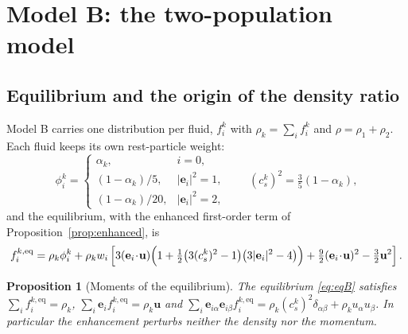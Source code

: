 \documentclass[11pt,a4paper]{article}
\theoremstyle{plain}
\newtheorem{proposition}{Proposition}
\theoremstyle{definition}
\newcommand{\ee}{\mathbf{e}}
\newcommand{\uu}{\mathbf{u}}
\newcommand{\cs}{c_s}
\begin{document}
\section{Model B: the two-population model}
\label{sec:modelB}

\subsection{Equilibrium and the origin of the density ratio}

Model B carries one distribution per fluid, $f_i^k$ with
$\rho_k = \sum_i f_i^k$ and $\rho = \rho_1 + \rho_2$. Each fluid keeps its own
rest-particle weight:
\begin{equation}
  \phi_i^k = \begin{cases}
    \alpha_k, & i = 0,\\
    (1-\alpha_k)/5, & |\ee_i|^2 = 1,\\
    (1-\alpha_k)/20, & |\ee_i|^2 = 2,
  \end{cases}
  \qquad
  (\cs^k)^2 = \tfrac35 (1 - \alpha_k),
  \label{eq:phik}
\end{equation}
and the equilibrium, with the enhanced first-order term of
Proposition~\ref{prop:enhanced}, is
\begin{equation}
  f_i^{k,\mathrm{eq}} = \rho_k \phi_i^k + \rho_k w_i \left[
    3(\ee_i\!\cdot\!\uu)\Bigl(1 + \tfrac12\bigl(3(\cs^k)^2 - 1\bigr)
      \bigl(3|\ee_i|^2 - 4\bigr)\Bigr)
    + \tfrac92 (\ee_i\!\cdot\!\uu)^2 - \tfrac32 \uu^2 \right].
  \label{eq:eqB}
\end{equation}

\begin{proposition}[Moments of the equilibrium]
\label{prop:momentsB}
The equilibrium \eqref{eq:eqB} satisfies
$\sum_i f_i^{k,\mathrm{eq}} = \rho_k$,
$\sum_i \ee_i f_i^{k,\mathrm{eq}} = \rho_k \uu$ and
$\sum_i \ee_{i\alpha}\ee_{i\beta} f_i^{k,\mathrm{eq}}
 = \rho_k (\cs^k)^2 \delta_{\alpha\beta} + \rho_k u_\alpha u_\beta$.
In particular the enhancement perturbs neither the density nor the momentum.
\end{proposition}
\end{document}
